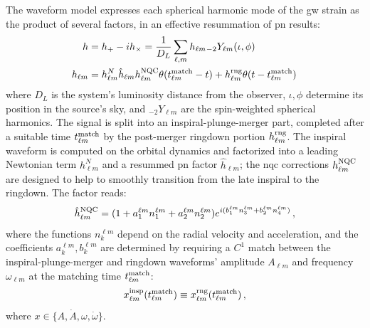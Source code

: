 \documentclass[prd,amssymb,amsmath,amsfonts,nofootinbib,reprint,showpacs,longbibliography]{revtex4-1}
\begin{document}
The waveform model expresses each spherical harmonic mode of the \ac{gw} strain as the product of
several factors, in an effective resummation of \ac{pn} results:
\begin{subequations}
\begin{align}
    h          &= h_+ - i h_\times = \dfrac{1}{D_L} \sum_{\ell, m} h_{\ell m} {}_{-2}Y_{\ell m} (\iota, \phi) \\
    h_{\ell m} &= h_{\ell m}^N \hat{h}_{\ell m} h_{\ell m}^{\rm NQC} \theta(t_{\ell m}^{\rm match} - t) + 
                  h_{\ell m}^{\rm rng} \theta(t - t_{\ell m}^{\rm match})\,
\end{align}
\end{subequations}
where $D_L$ is the system's luminosity distance from the observer, $\iota, \phi$ determine its position
in the source's sky, and ${}_{-2}Y_{\ell m}$ are the spin-weighted spherical harmonics. The signal is split
into an inspiral-plunge-merger part, completed after a suitable time $t_{\ell m}^{\rm match}$ by the post-merger
ringdown portion $h_{\ell m}^{\rm rng}$. The inspiral waveform is computed on the orbital dynamics and
factorized into a leading Newtonian term $h_{\ell m}^N$ and a resummed \ac{pn} factor $\hat{h}_{\ell m}$;
the \ac{nqc} corrections $h_{\ell m}^{\rm NQC}$ are designed to help to smoothly transition from the late
inspiral to the ringdown. The factor reads:
\begin{equation}
    \hat{h}_{\ell m}^{\rm NQC} = (1 + a_1^{\ell m} n_1^{\ell m} + a_2^{\ell m} n_2^{\ell m}) e^{i (b_1^{\ell m} n_3^{\ell m} + b_2^{\ell m} n_4^{\ell m})}\, ,
\end{equation}
where the functions $n_k^{\ell m}$ depend on the radial velocity and acceleration, and the coefficients $a_k^{\ell m},
b_k^{\ell m}$ are determined by requiring a $C^1$ match between the inspiral-plunge-merger and ringdown
waveforms' amplitude $A_{\ell m}$ and frequency $\omega_{\ell m}$ at the matching time $t_{\ell m}^{\rm match}$:
\begin{equation}
    x_{\ell m}^{\rm insp} (t_{\ell m}^{\rm match}) \equiv x_{\ell m}^{\rm rng} (t_{\ell m}^{\rm match})\, ,
\end{equation}
where $x \in \{A, \dot{A}, \omega, \dot{\omega}\}$.
\end{document}
